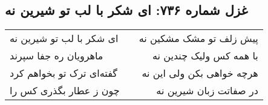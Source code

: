 \begin{center}
\section*{غزل شماره ۷۳۶: ای شکر با لب تو شیرین نه}
\label{sec:736}
\begin{longtable}{l p{0.5cm} r}
ای شکر با لب تو شیرین نه
&&
پیش زلف تو مشک مشکین نه
\\
ماهرویان ره جفا سپرند
&&
با همه کس ولیک چندین نه
\\
گفته‌ای ترک تو بخواهم کرد
&&
هرچه خواهی بکن ولی این نه
\\
چون ز عطار بگذری کس را
&&
در صفاتت زبان شیرین نه
\\
\end{longtable}
\end{center}
